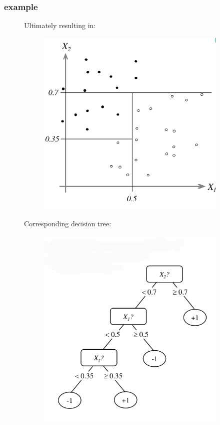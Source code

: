 \documentclass{beamer}
\begin{document}
\begin{frame}
\frametitle{example}
\begin{figure}
\centering
\begin{minipage}{.5\textwidth}
Ultimately resulting in:
\begin{figure}
  \centering
  \includegraphics[width=.9\linewidth]{figures/04/01_classification/example_decision_5.png}
\end{figure}
\end{minipage}%
\begin{minipage}{.5\textwidth}
Corresponding decision tree:
\begin{figure}
  \centering
  \includegraphics[width=.9\linewidth]{figures/04/01_classification/example_decision_6.png}
\end{figure}

\end{minipage}
\end{figure}
\end{frame}
\end{document}
